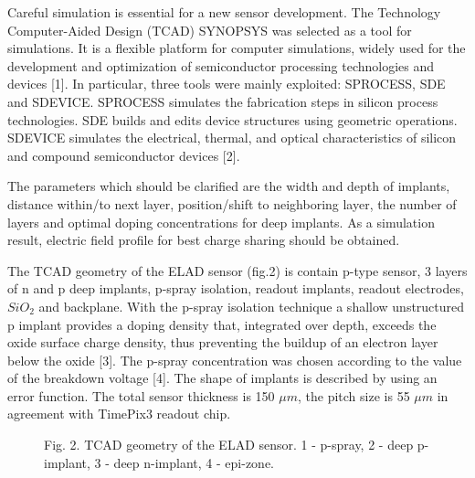 Careful simulation is essential for a new sensor development. The  Technology Computer-Aided Design (TCAD) SYNOPSYS was selected  as a tool for simulations. It is a flexible platform for computer simulations, widely used for the development and optimization of semiconductor processing technologies and devices [1]. In particular, three tools were mainly exploited: SPROCESS, SDE and SDEVICE. SPROCESS simulates the fabrication steps in silicon process technologies. SDE builds and edits device structures using geometric operations. SDEVICE simulates the electrical, thermal, and optical characteristics of silicon and compound semiconductor devices [2].

The parameters which should be clarified are the width and depth of implants, distance within/to next layer, position/shift to neighboring layer, the number of layers and optimal doping concentrations for deep implants. As a simulation result, electric field profile for best charge sharing should be obtained. 

The TCAD geometry of the ELAD sensor (fig.2) is contain p-type sensor, 3 layers of n and p deep implants, p-spray isolation, readout implants, readout electrodes, $SiO_2$ and backplane. With the p-spray isolation technique a shallow unstructured p implant provides a doping density that, integrated over depth, exceeds the oxide surface charge density, thus preventing the buildup of an electron layer below the oxide [3]. The p-spray concentration was chosen according to the value of the breakdown voltage [4]. The shape of implants is described by using an error function. The total sensor thickness is 150 $\mu m$, the pitch size is 55 $\mu m$ in agreement with TimePix3 readout chip. 

\begin{figure}[h]

Fig. 2. TCAD geometry of the ELAD sensor. 1 - p-spray, 2 - deep p-implant, 3 - deep n-implant, 4 - epi-zone. 
\end{figure}

